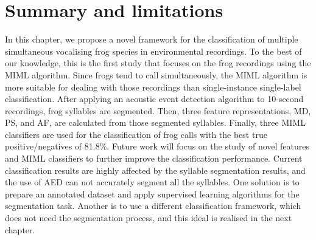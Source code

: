 \section{Summary and limitations}
In this chapter, we propose a novel framework for the classification of multiple simultaneous vocalising frog species in environmental recordings. To the best of our knowledge, this is the first study that focuses on the frog recordings using the MIML algorithm. Since frogs tend to call simultaneously, the MIML algorithm is more suitable for dealing with those recordings than single-instance single-label classification. After applying an acoustic event detection algorithm to 10-second recordings, frog syllables are segmented. Then, three feature representations, MD, PS, and AF, are calculated from those segmented syllables. Finally, three MIML classifiers are used for the classification of frog calls with the best true positive/negatives of 81.8\%. Future work will focus on the study of novel features and MIML classifiers to further improve the classification performance. Current classification results are highly affected by the syllable segmentation results, and the use of AED can not accurately segment all the syllables. One solution is to prepare an annotated dataset and apply supervised learning algorithms for the segmentation task. Another is to use a different classification framework, which does not need the segmentation process, and this ideal is realised in the next chapter. 


